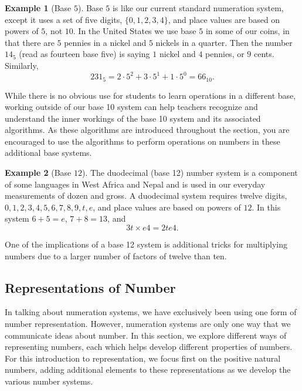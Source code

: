 \documentclass[
]{book}
\theoremstyle{definition}
\theoremstyle{definition}
\newtheorem{example}{Example}[chapter]
\theoremstyle{definition}
\theoremstyle{remark}
\begin{document}
\begin{example}[Base $5$]
\protect\hypertarget{exm:unnamed-chunk-62}{}{\label{exm:unnamed-chunk-62} {} }Base \(5\) is like our current standard numeration system, except it uses a set of five digits, \(\{0,1,2,3,4\}\), and place values are based on powers of \(5\), not \(10\). In the United States we use base \(5\) in some of our coins, in that there are \(5\) pennies in a nickel and \(5\) nickels in a quarter. Then the number \(14_{5}\) (read as fourteen base five) is saying \(1\) nickel and \(4\) pennies, or \(9\) cents. Similarly,
\[231_{5} = 2\cdot 5^2 + 3\cdot 5^1 + 1 \cdot 5^0 = 66_{10}.\]
\end{example}

While there is no obvious use for students to learn operations in a different base, working outside of our base 10 system can help teachers recognize and understand the inner workings of the base 10 system and its associated algorithms. As these algorithms are introduced throughout the section, you are encouraged to use the algorithms to perform operations on numbers in these additional base systems.

\begin{example}[Base $12$]
\protect\hypertarget{exm:unnamed-chunk-63}{}{\label{exm:unnamed-chunk-63} {} }The duodecimal (base 12) number system is a component of some languages in West Africa and Nepal and is used in our everyday measurements of dozen and gross. A duodecimal system requires twelve digits, \(0,1,2,3,4,5,6,7,8,9,t,e\), and place values are based on powers of \(12\). In this system \(6+5=e\), \(7+8=13\), and
\[3t \times e4 = 2te4.\]

One of the implications of a base 12 system is additional tricks for multiplying numbers due to a larger number of factors of twelve than ten.
\end{example}

\hypertarget{representations-of-number}{%
\subsection{Representations of Number}\label{representations-of-number}}

In talking about numeration systems, we have exclusively been using one form of number representation. However, numeration systems are only one way that we communicate ideas about number. In this section, we explore different ways of representing numbers, each which helps develop different properties of numbers. For this introduction to representation, we focus first on the positive natural numbers, adding additional elements to these representations as we develop the various number systems.
\end{document}
